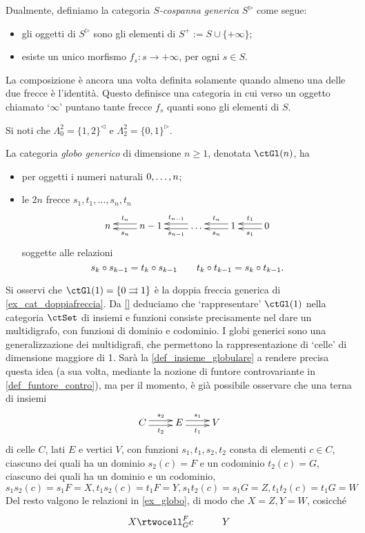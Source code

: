 \begin{example}
	Dualmente, definiamo la categoria \emph{\(S\)-cospanna generica} \(S^\rhd\) come segue:
	\begin{itemize}
		\item gli oggetti di \(S^\rhd\) sono gli elementi di \(S^+ := S\cup \{+\infty\}\);
		\item esiste un unico morfismo \(f_s : s\to+\infty\), per ogni \(s\in S\).
	\end{itemize}
	La composizione è ancora una volta definita solamente quando almeno una delle due frecce è l'identità. Questo definisce una categoria in cui verso un oggetto chiamato `\(\infty\)' puntano tante frecce \(f_s\) quanti sono gli elementi di \(S\).

	Si noti che \(\Lambda^2_0=\{1,2\}^\lhd\) e \(\Lambda^2_2=\{0,1\}^\rhd\).
\end{example}
\begin{example}
	\label{ex_globo}
	La categoria \emph{globo generico} di dimensione \(n\ge 1\), denotata \(\ctGl(n)\), ha
	\begin{itemize}
		\item per oggetti i numeri naturali \(\iter[0]n\);
		\item le \(2n\) frecce \(s_1,t_1,\dots,s_n,t_n\)
		      \[\xymatrix{
			      n &\ar@<.25em>[l]^-{s_n}\ar@<-.25em>[l]_-{t_n} n-1 &\ar@<.25em>[l]^-{s_{n-1}}\ar@<-.25em>[l]_-{t_{n-1}} \dots &\ar@<.25em>[l]^-{s_n}\ar@<-.25em>[l]_-{t_n} 1 &\ar@<.25em>[l]^-{s_1}\ar@<-.25em>[l]_-{t_1} 0
			      }\]
		      soggette alle relazioni
		      \[s_k\circ s_{k-1} = t_k\circ s_{k-1}\qquad t_k\circ t_{k-1} = s_k\circ t_{k-1}.\]
	\end{itemize}
\end{example}
\begin{remark}
	\Todo{}
	Si osservi che $\ctGl(1) = \{0\rightrightarrows 1\}$ è la doppia freccia generica di \ref{ex_cat_doppiafreccia}. Da \ref{} deduciamo che `rappresentare' $\ctGl(1)$ nella categoria $\ctSet$ di insiemi e funzioni consiste precisamente nel dare un multidigrafo, con funzioni di dominio e codominio. I globi generici sono una generalizzazione dei multidigrafi, che permettono la rappresentazione di `celle' di dimensione maggiore di 1. Sarà la \autoref{def_insieme_globulare} a rendere precisa questa idea (a sua volta, mediante la nozione di funtore controvariante in \ref{def_funtore_contro}), ma per il momento, è già possibile osservare che una terna di insiemi 
	\[\xymatrix{
		C \ar@<.25em>[r]^-{s_2}\ar@<-.25em>[r]_-{t_2}& E \ar@<.25em>[r]^-{s_1}\ar@<-.25em>[r]_-{t_1}& V
	}\]
	di celle $C$, lati $E$ e vertici $V$, con funzioni $s_1,t_1,s_2,t_2$ consta di elementi $c\in C$, ciascuno dei quali ha un dominio $s_2(c) = F$ e un codominio $t_2(c)=G$, ciascuno dei quali ha un dominio e un codominio, 
	\[s_1s_2(c) = s_1 F = X, t_1s_2(c) = t_1 F = Y, s_1t_2(c) = s_1 G = Z , t_1t_2(c) = t_1 G = W\]
	Del resto valgono le relazioni in \ref{ex_globo}, di modo che $X=Z,	Y=W$, cosicché
	\[\xymatrix{
		X \rtwocell^F_G{c} & Y
	}\]
\end{remark}
